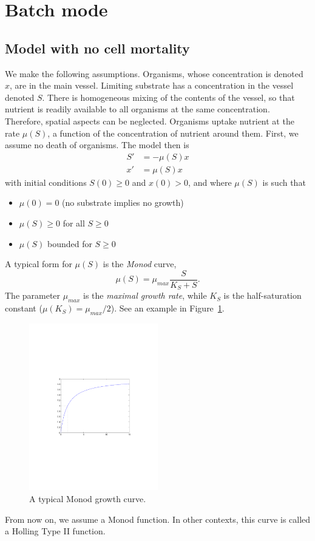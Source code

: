 \section{Batch mode}
\subsection{Model with no cell mortality}
We make the following assumptions. Organisms, whose concentration is denoted $x$, are in the main vessel. Limiting substrate has a concentration in the vessel denoted $S$. There is homogeneous mixing of the contents of the vessel, so that nutrient is readily available to all organisms at the same  concentration. Therefore, spatial aspects can be neglected. Organisms uptake nutrient at the rate $\mu(S)$, a function of the concentration of nutrient around them.
First, we assume no death of organisms. The model then is
\begin{subequations}\label{sys:chemo_batch_nodeath}
\begin{align}
S' &= -\mu(S)x \\
x' &= \mu(S)x
\end{align}
\end{subequations}
with initial conditions $S(0)\geq 0$ and $x(0)>0$, and
where $\mu(S)$ is such that
\begin{itemize}
\item $\mu(0)=0$ (no substrate implies no growth)
\item $\mu(S)\geq 0$ for all $S\geq 0$
\item $\mu(S)$ bounded for $S\geq 0$
\end{itemize}
A typical form for $\mu(S)$ is the \emph{Monod} curve,
\begin{equation}\label{eq:monod}
\mu(S)=\mu_{max}\frac S{K_S+S}.
\end{equation}
The parameter $\mu_{max}$ is the \emph{maximal growth rate}, while $K_S$ is
the half-saturation constant ($\mu(K_S)=\mu_{max}/2$). See an example in
Figure~\ref{fig:monod_curve}.
\begin{figure}[htbp]
\begin{center}
\includegraphics[width=0.5\textwidth]{../figs_05_chemostat/monod}
\caption{A typical Monod growth curve.}
\end{center}
\label{fig:monod_curve}
\end{figure}
From now on, we assume a Monod function. 
In other contexts, this curve is called a Holling Type II function.


